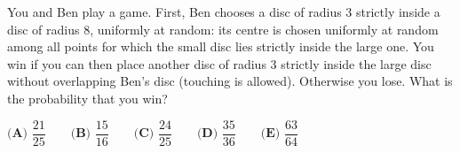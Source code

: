 You and Ben play a game. First, Ben chooses a disc of radius $3$ strictly inside a disc of radius $8$, uniformly at random: its centre is chosen uniformly at random among all points for which the small disc lies strictly inside the large one. You win if you can then place another disc of radius $3$ strictly inside the large disc without overlapping Ben's disc (touching is allowed). Otherwise you lose. What is the probability that you win?

$\textbf{(A) }\dfrac{21}{25}\qquad\textbf{(B) }\dfrac{15}{16}\qquad\textbf{(C) }\dfrac{24}{25}\qquad\textbf{(D) }\dfrac{35}{36}\qquad\textbf{(E) }\dfrac{63}{64}$
